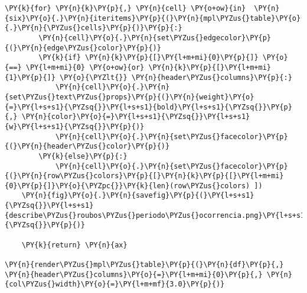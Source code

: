 \begin{tcolorbox}[breakable, size=fbox, boxrule=1pt, pad at break*=1mm,colback=cellbackground, colframe=cellborder]
\begin{Verbatim}[commandchars=\\\{\}]
    \PY{k}{for} \PY{n}{k}\PY{p}{,} \PY{n}{cell} \PY{o+ow}{in}  \PY{n}{six}\PY{o}{.}\PY{n}{iteritems}\PY{p}{(}\PY{n}{mpl\PYZus{}table}\PY{o}{.}\PY{n}{\PYZus{}cells}\PY{p}{)}\PY{p}{:}
        \PY{n}{cell}\PY{o}{.}\PY{n}{set\PYZus{}edgecolor}\PY{p}{(}\PY{n}{edge\PYZus{}color}\PY{p}{)}
        \PY{k}{if} \PY{n}{k}\PY{p}{[}\PY{l+m+mi}{0}\PY{p}{]} \PY{o}{==} \PY{l+m+mi}{0} \PY{o+ow}{or} \PY{n}{k}\PY{p}{[}\PY{l+m+mi}{1}\PY{p}{]} \PY{o}{\PYZlt{}} \PY{n}{header\PYZus{}columns}\PY{p}{:}
            \PY{n}{cell}\PY{o}{.}\PY{n}{set\PYZus{}text\PYZus{}props}\PY{p}{(}\PY{n}{weight}\PY{o}{=}\PY{l+s+s1}{\PYZsq{}}\PY{l+s+s1}{bold}\PY{l+s+s1}{\PYZsq{}}\PY{p}{,} \PY{n}{color}\PY{o}{=}\PY{l+s+s1}{\PYZsq{}}\PY{l+s+s1}{w}\PY{l+s+s1}{\PYZsq{}}\PY{p}{)}
            \PY{n}{cell}\PY{o}{.}\PY{n}{set\PYZus{}facecolor}\PY{p}{(}\PY{n}{header\PYZus{}color}\PY{p}{)}
        \PY{k}{else}\PY{p}{:}
            \PY{n}{cell}\PY{o}{.}\PY{n}{set\PYZus{}facecolor}\PY{p}{(}\PY{n}{row\PYZus{}colors}\PY{p}{[}\PY{n}{k}\PY{p}{[}\PY{l+m+mi}{0}\PY{p}{]}\PY{o}{\PYZpc{}}\PY{k}{len}(row\PYZus{}colors) ])
    \PY{n}{fig}\PY{o}{.}\PY{n}{savefig}\PY{p}{(}\PY{l+s+s1}{\PYZsq{}}\PY{l+s+s1}{describe\PYZus{}roubos\PYZus{}periodo\PYZus{}ocorrencia.png}\PY{l+s+s1}{\PYZsq{}}\PY{p}{)}
    
    \PY{k}{return} \PY{n}{ax}

\PY{n}{render\PYZus{}mpl\PYZus{}table}\PY{p}{(}\PY{n}{df}\PY{p}{,} \PY{n}{header\PYZus{}columns}\PY{o}{=}\PY{l+m+mi}{0}\PY{p}{,} \PY{n}{col\PYZus{}width}\PY{o}{=}\PY{l+m+mf}{3.0}\PY{p}{)}
\end{Verbatim}
\end{tcolorbox}